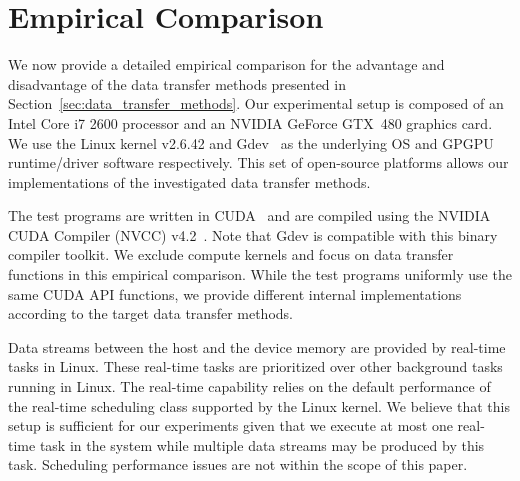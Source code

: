\section{Empirical Comparison}
\label{sec:empirical_comparison}

We now provide a detailed empirical comparison for the advantage and
disadvantage of the data transfer methods presented in
Section~\ref{sec:data_transfer_methods}.
Our experimental setup is composed of an Intel Core i7 2600 processor
and an NVIDIA GeForce GTX~480 graphics card.
We use the Linux kernel v2.6.42 and Gdev~\cite{Kato_ATC12} as the
underlying OS and GPGPU runtime/driver software respectively.
This set of open-source platforms allows our implementations of the
investigated data transfer methods.

The test programs are written in CUDA~\cite{NVIDIA_CUDA} and are compiled
using the NVIDIA CUDA Compiler (NVCC) v4.2~\cite{NVIDIA_NVCC}.
Note that Gdev is compatible with this binary compiler toolkit.
We exclude compute kernels and focus on data transfer functions in this
empirical comparison.
While the test programs uniformly use the same CUDA API functions, we
provide different internal implementations according to the target data
transfer methods.

Data streams between the host and the device memory are provided by
real-time tasks in Linux.
These real-time tasks are prioritized over other background tasks
running in Linux.
The real-time capability relies on the default performance of the
real-time scheduling class supported by the Linux kernel.
We believe that this setup is sufficient for our experiments given that
we execute at most one real-time task in the system while multiple data
streams may be produced by this task.
Scheduling performance issues are not within the scope of this paper.


